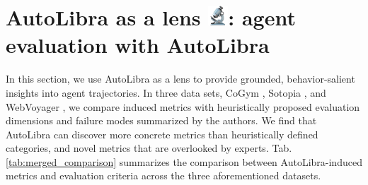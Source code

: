 \section{\texorpdfstring{AutoLibra as a lens \includegraphics[height=1em]{figs/microscope.png}: agent evaluation with AutoLibra}{AutoLibra as a lens: agent evaluation with AutoLibra}}
\label{sec:lens}

In this section, we use AutoLibra as a lens to provide grounded, behavior-salient insights into agent trajectories. In three data sets, CoGym \citep{shao2024collaborative}, Sotopia \citep{zhousotopia}, and WebVoyager \citep{he2024webvoyager}, we compare induced metrics with heuristically proposed evaluation dimensions and failure modes summarized by the authors. We find that AutoLibra can discover more concrete metrics than heuristically defined categories, and novel metrics that are overlooked by experts. 
Tab. \ref{tab:merged_comparison} summarizes the comparison between AutoLibra-induced metrics and evaluation criteria across the three aforementioned datasets.




